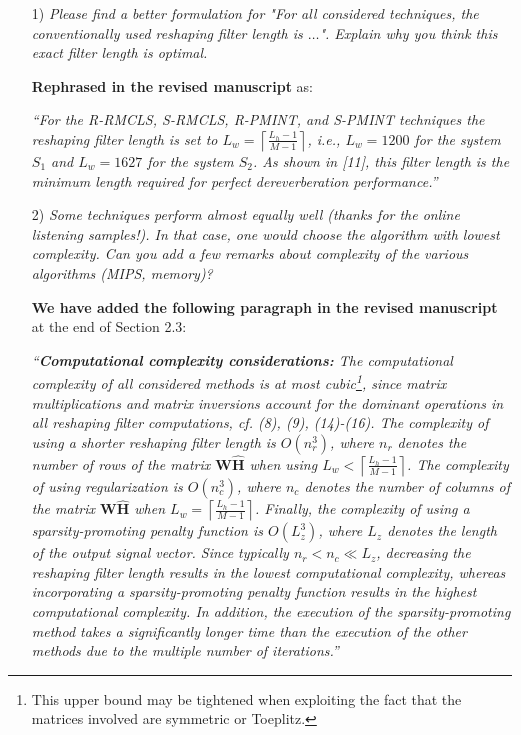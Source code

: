 \documentclass[10pt, a4paper]{article}
\begin{document}
\begin{itemize}
\item[1)] {\textit{Please find a better formulation for "For all considered techniques, the conventionally used reshaping filter length is $\ldots$". Explain why you think this exact filter length is optimal.}}

{\textbf{Rephrased in the revised manuscript}} as:

{\emph{``For the R-RMCLS, S-RMCLS, R-PMINT, and S-PMINT techniques the reshaping filter length is set to $L_w = \left\lceil{\frac{L_h-1}{M-1}}\right\rceil$, i.e., $L_w = 1200$ for the system $S_1$ and $L_w = 1627$ for the system $S_2$. 
As shown in [11], this filter length is the minimum length required for perfect dereverberation performance.''
}}

\item[2)] {\textit{Some techniques perform almost equally well (thanks for the online listening samples!). In that case, one would choose the algorithm with lowest complexity. Can you add a few remarks about complexity of the various algorithms (MIPS, memory)?}}

{\textbf{We have added the following paragraph in the revised manuscript}} at the end of Section 2.3:

{\emph{``\textbf{Computational complexity considerations:} \enspace  The computational complexity of all considered methods is at most cubic\footnote{This upper bound may be tightened when exploiting the fact that the matrices involved are symmetric or Toeplitz.}, since matrix multiplications and matrix inversions account for the dominant operations in all reshaping filter computations, cf. (8), (9), (14)-(16). 
The complexity of using a shorter reshaping filter length is $O(n_r^3)$, where $n_r$ denotes the number of rows of the matrix $\mathbf{W}\hat{\mathbf{H}}$ when using $L_w < \left\lceil{\frac{L_h-1}{M-1}}\right\rceil$.
The complexity of using regularization is $O(n_c^3)$, where $n_c$ denotes the number of columns of the matrix $\mathbf{W}\hat{\mathbf{H}}$ when $L_w = \left\lceil{\frac{L_h-1}{M-1}}\right\rceil$.
Finally, the complexity of using a sparsity-promoting penalty function is $O(L_z^3)$, where $L_z$ denotes the length of the output signal vector. 
Since typically $n_r < n_c \ll L_z$, decreasing the reshaping filter length results in the lowest computational complexity, whereas incorporating a sparsity-promoting penalty function results in the highest computational complexity.
In addition, the execution of the sparsity-promoting method takes a significantly longer time than the execution of the other methods due to the multiple number of iterations.''}}

\end{itemize}
\end{document}

